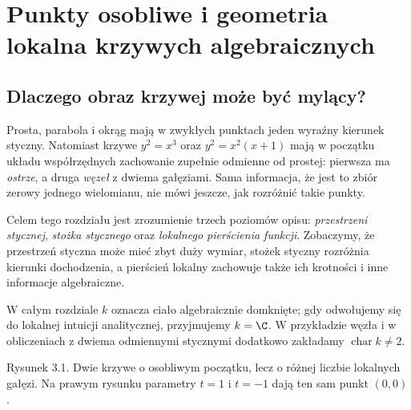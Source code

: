 \chapter{Punkty osobliwe i geometria lokalna krzywych algebraicznych}
\label{ch:osobliwosci}

\section{Dlaczego obraz krzywej może być mylący?}

Prosta, parabola i okrąg mają w zwykłych punktach jeden wyraźny
kierunek styczny. Natomiast krzywe $y^2=x^3$ oraz
$y^2=x^2(x+1)$ mają w początku układu współrzędnych
zachowanie zupełnie odmienne od prostej: pierwsza ma
\emph{ostrze}, a druga \emph{węzeł} z dwiema gałęziami.
Sama informacja, że jest to zbiór zerowy jednego wielomianu,
nie mówi jeszcze, jak rozróżnić takie punkty.

Celem tego rozdziału jest zrozumienie trzech poziomów opisu:
\emph{przestrzeni stycznej}, \emph{stożka stycznego} oraz
\emph{lokalnego pierścienia funkcji}. Zobaczymy, że przestrzeń
styczna może mieć zbyt duży wymiar, stożek styczny rozróżnia
kierunki dochodzenia, a pierścień lokalny zachowuje także
ich krotności i inne informacje algebraiczne.

W całym rozdziale $k$ oznacza ciało algebraicznie domknięte;
gdy odwołujemy się do lokalnej intuicji analitycznej,
przyjmujemy $k=\C$. W przykładzie węzła i w obliczeniach
z dwiema odmiennymi stycznymi dodatkowo zakładamy
$\operatorname{char}k\ne2$.

\begin{center}

\small Rysunek 3.1. Dwie krzywe o osobliwym początku, lecz o różnej
liczbie lokalnych gałęzi. Na prawym rysunku parametry $t=1$ i $t=-1$
dają ten sam punkt $(0,0)$.
\end{center}

